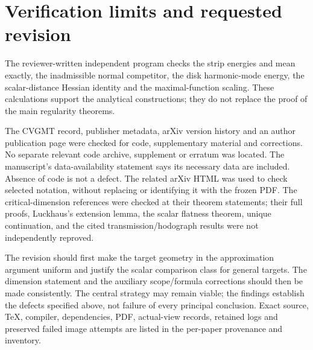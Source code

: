 \documentclass[10pt]{article}
\begin{document}
\section*{Verification limits and requested revision}
The reviewer-written independent program checks the strip energies and mean exactly, the inadmissible normal competitor, the disk harmonic-mode energy, the scalar-distance Hessian identity and the maximal-function scaling. These calculations support the analytical constructions; they do not replace the proof of the main regularity theorems.\par
The CVGMT record, publisher metadata, arXiv version history and an author publication page were checked for code, supplementary material and corrections. No separate relevant code archive, supplement or erratum was located. The manuscript’s data-availability statement says its necessary data are included. Absence of code is not a defect. The related arXiv HTML was used to check selected notation, without replacing or identifying it with the frozen PDF. The critical-dimension references were checked at their theorem statements; their full proofs, Luckhaus’s extension lemma, the scalar flatness theorem, unique continuation, and the cited transmission/hodograph results were not independently reproved.\par
The revision should first make the target geometry in the approximation argument uniform and justify the scalar comparison class for general targets. The dimension statement and the auxiliary scope/formula corrections should then be made consistently. The central strategy may remain viable; the findings establish the defects specified above, not failure of every principal conclusion. Exact source, TeX, compiler, dependencies, PDF, actual-view records, retained logs and preserved failed image attempts are listed in the per-paper provenance and inventory.\par
\end{document}
